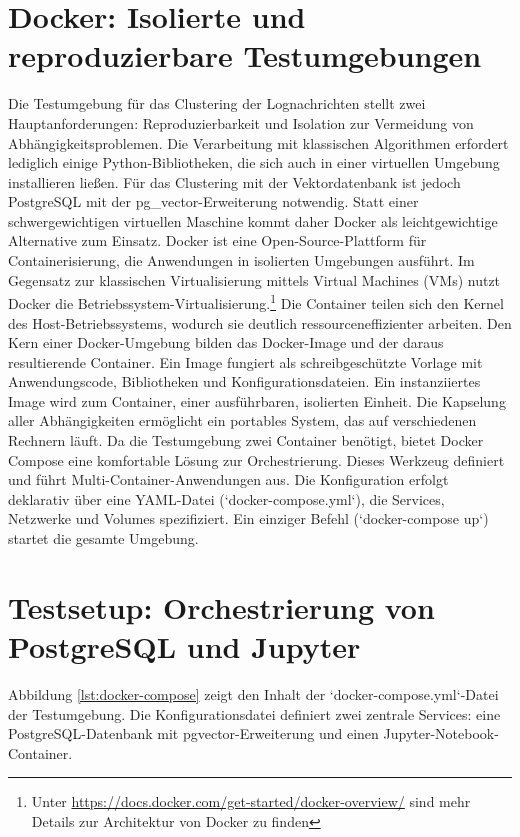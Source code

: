 \section{Docker: Isolierte und reproduzierbare Testumgebungen}

Die Testumgebung für das Clustering der Lognachrichten stellt zwei Hauptanforderungen: Reproduzierbarkeit und Isolation zur Vermeidung von Abhängigkeitsproblemen. Die Verarbeitung mit klassischen Algorithmen erfordert lediglich einige Python-Bibliotheken, die sich auch in einer virtuellen Umgebung installieren ließen. Für das Clustering mit der Vektordatenbank ist jedoch PostgreSQL mit der pg\_vector-Erweiterung notwendig. Statt einer schwergewichtigen virtuellen Maschine kommt daher Docker als leichtgewichtige Alternative zum Einsatz.
Docker ist eine Open-Source-Plattform für Containerisierung, die Anwendungen in isolierten Umgebungen ausführt. Im Gegensatz zur klassischen Virtualisierung mittels Virtual Machines (\acsp{VM}) nutzt Docker die Betriebssystem-Virtualisierung.\footnote{Unter \url{https://docs.docker.com/get-started/docker-overview/} sind mehr Details zur Architektur von Docker zu finden} Die Container teilen sich den Kernel des Host-Betriebssystems, wodurch sie deutlich ressourceneffizienter arbeiten.
Den Kern einer Docker-Umgebung bilden das Docker-Image und der daraus resultierende Container. Ein Image fungiert als schreibgeschützte Vorlage mit Anwendungscode, Bibliotheken und Konfigurationsdateien. Ein instanziiertes Image wird zum Container, einer ausführbaren, isolierten Einheit. Die Kapselung aller Abhängigkeiten ermöglicht ein portables System, das auf verschiedenen Rechnern läuft. Da die Testumgebung zwei Container benötigt, bietet Docker Compose eine komfortable Lösung zur Orchestrierung. Dieses Werkzeug definiert und führt Multi-Container-Anwendungen aus. Die Konfiguration erfolgt deklarativ über eine \ac{YAML}-Datei (`docker-compose.yml`), die Services, Netzwerke und Volumes spezifiziert. Ein einziger Befehl (`docker-compose up`) startet die gesamte Umgebung.


\section{Testsetup: Orchestrierung von PostgreSQL und Jupyter}
Abbildung \ref{lst:docker-compose} zeigt den Inhalt der `docker-compose.yml`-Datei der Testumgebung. Die Konfigurationsdatei definiert zwei zentrale Services: eine PostgreSQL-Datenbank mit pgvector-Erweiterung und einen Jupyter-Notebook-Container.
\newpage

